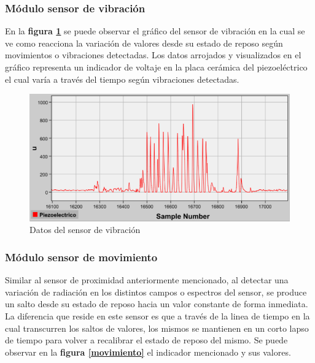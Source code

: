 \documentclass{IEEEtran}
\begin{document}
			\subsubsection{Módulo sensor de vibración}

				En la \textbf{figura \ref{piezo}} se puede observar el gráfico del sensor de vibración en la cual se ve como reacciona la variación de valores desde su estado de reposo según movimientos o vibraciones detectadas. Los datos arrojados y visualizados en el gráfico representa un indicador de voltaje en la placa cerámica del piezoeléctrico el cual varía a través del tiempo según vibraciones detectadas. 

				\begin{figure}
					\centering
					\includegraphics[width=1\linewidth]{piezo}
					\caption{Datos del sensor de vibración}
					\label{piezo}
				\end{figure}

			\subsubsection{Módulo sensor de movimiento}
				
				Similar al sensor de proximidad anteriormente mencionado, al detectar una variación de radiación en los distintos campos o espectros del sensor, se produce un salto desde su estado de reposo hacia un valor constante de forma inmediata. La diferencia que reside en este sensor es que a través de la linea de tiempo en la cual transcurren los saltos de valores, los mismos se mantienen en un corto lapso de tiempo para volver a recalibrar el estado de reposo del mismo. Se puede observar en la \textbf{figura \ref{movimiento}} el indicador mencionado y sus valores.
\end{document}
